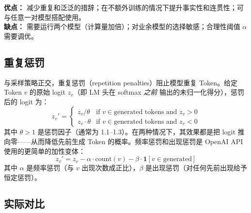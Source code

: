 \textbf{优点：} 减少重复和泛泛的措辞；在不额外训练的情况下提升事实性和连贯性；可与任意一对模型搭配使用。\\

\textbf{缺点：} 需要运行两个模型（计算量加倍）；对业余模型的选择敏感；合理性阈值 $\alpha$ 需要调优。

\subsection{重复惩罚}
\label{repetition-penalties}

与采样策略正交，重复惩罚（repetition penalties）阻止模型重复 Token。给定 Token $v$ 的原始 logit $z_v$（即 LM 头在 softmax \emph{之前} 输出的未归一化得分），惩罚后的 logit 为：
\[
z_v' = \begin{cases}
    z_v / \theta & \text{if } v \in \text{generated tokens and } z_v > 0 \\
    z_v \cdot \theta & \text{if } v \in \text{generated tokens and } z_v < 0
  \end{cases}
\]
其中 $\theta > 1$ 是惩罚因子（通常为 1.1--1.3）。在两种情况下，其效果都是把 logit 推向零——从而降低先前生成 Token 的概率。频率惩罚和出现惩罚是 OpenAI API 使用的更简单的加性变体：
\[
z_v' = z_v - \alpha \cdot \text{count}(v) - \beta \cdot \mathbf{1}[v \in \text{generated}]
\]
其中 $\alpha$ 是频率惩罚（与 $v$ 出现次数成正比），$\beta$ 是出现惩罚（对任何先前出现给予恒定惩罚）。

\subsection{实际对比}
\label{practical-comparison}

